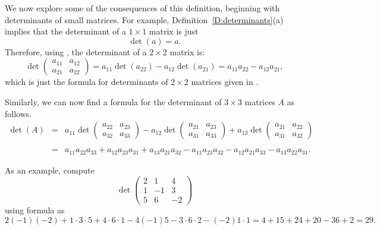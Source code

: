 \documentclass{ximera}
\begin{document}
We now explore some of the consequences of this definition, beginning 
with determinants of small matrices.  For example, 
Definition~\ref{D:determinants}(a) implies that the determinant of a 
$1\times 1$ matrix is just
\[
\det(a) = a.
\]
Therefore, using , the determinant of a $2\times
2$ matrix is:
\[
\det\left(\begin{array}{cc} a_{11} & a_{12}\\a_{21} & a_{22}
\end{array}\right) = a_{11}\det(a_{22}) - a_{12}\det(a_{21}) =
a_{11}a_{22} - a_{12}a_{21},
\]
which is just the formula for determinants of $2\times 2$
matrices given in . 
 
Similarly, we can now find a formula for the determinant of
$3\times 3$ matrices $A$ as follows.
\begin{eqnarray} 
\det(A) & = & a_{11}
\det \left(\begin{array}{cc} a_{22} & a_{23}\\a_{32} & a_{33}
\end{array}\right) 
- a_{12}
\det \left(\begin{array}{cc} a_{21} & a_{23}\\a_{31} & a_{33}
\end{array}\right) 
+ a_{13}
\det\left(\begin{array}{cc} a_{21} & a_{22}\\a_{31} & a_{32}
\end{array}\right) \nonumber \\
 & & \label{e:det3} \\
& = & a_{11}a_{22}a_{33} + a_{12}a_{23}a_{31} + a_{13}a_{21}a_{32}
- a_{11}a_{23}a_{32} - a_{12}a_{21}a_{33} - a_{13}a_{22}a_{31}. \nonumber
\end{eqnarray}  

As an example, compute
\[
\det\left(\begin{array}{rrr} 2 & 1 & 4\\ 1 & -1 & 3\\ 5 & 6 & -2
\end{array}\right) 
\]
using formula  as
\[
2(-1)(-2) + 1\cdot3\cdot5 + 4\cdot6\cdot1 -4(-1)5 -3\cdot6\cdot2
- (-2)1\cdot1  = 4+15+24+20 -36 +2 = 29. 
\]
\end{document}
